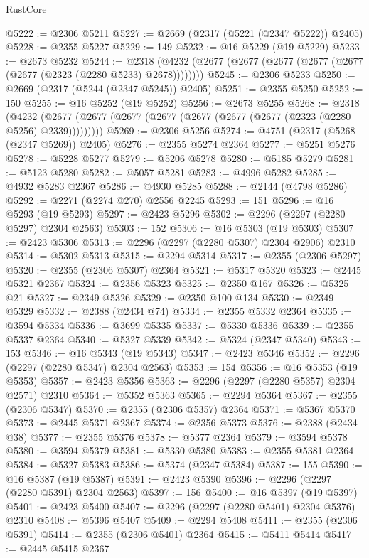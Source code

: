 \begin{lexlean}{RustCore}
\begin{coremodule}
@5222 := @2306 @5211
@5227 := @2669 (@2317 (@5221 (@2347 @5222)) @2405)
@5228 := @2355 @5227
@5229 := 149
@5232 := @16 @5229 (@19 @5229)
@5233 := @2673 @5232
@5244 := @2318 (@4232 (@2677 (@2677 (@2677 (@2677 (@2677 (@2677 (@2323 (@2280 @5233) @2678))))))))
@5245 := @2306 @5233
@5250 := @2669 (@2317 (@5244 (@2347 @5245)) @2405)
@5251 := @2355 @5250
@5252 := 150
@5255 := @16 @5252 (@19 @5252)
@5256 := @2673 @5255
@5268 := @2318
    (@4232 (@2677 (@2677 (@2677 (@2677 (@2677 (@2677 (@2677 (@2323 (@2280 @5256) @2339)))))))))
@5269 := @2306 @5256
@5274 := @4751 (@2317 (@5268 (@2347 @5269)) @2405)
@5276 := @2355 @5274 @2364
@5277 := @5251 @5276
@5278 := @5228 @5277
@5279 := @5206 @5278
@5280 := @5185 @5279
@5281 := @5123 @5280
@5282 := @5057 @5281
@5283 := @4996 @5282
@5285 := @4932 @5283 @2367
@5286 := @4930 @5285
@5288 := @2144 (@4798 @5286)
@5292 := @2271 (@2274 @270) @2556 @2245
@5293 := 151
@5296 := @16 @5293 (@19 @5293)
@5297 := @2423 @5296
@5302 := @2296 (@2297 (@2280 @5297) @2304 @2563)
@5303 := 152
@5306 := @16 @5303 (@19 @5303)
@5307 := @2423 @5306
@5313 := @2296 (@2297 (@2280 @5307) @2304 @2906) @2310
@5314 := @5302 @5313
@5315 := @2294 @5314
@5317 := @2355 (@2306 @5297)
@5320 := @2355 (@2306 @5307) @2364
@5321 := @5317 @5320
@5323 := @2445 @5321 @2367
@5324 := @2356 @5323
@5325 := @2350 @167
@5326 := @5325 @21
@5327 := @2349 @5326
@5329 := @2350 @100 @134
@5330 := @2349 @5329
@5332 := @2388 (@2434 @74)
@5334 := @2355 @5332 @2364
@5335 := @3594 @5334
@5336 := @3699 @5335
@5337 := @5330 @5336
@5339 := @2355 @5337 @2364
@5340 := @5327 @5339
@5342 := @5324 (@2347 @5340)
@5343 := 153
@5346 := @16 @5343 (@19 @5343)
@5347 := @2423 @5346
@5352 := @2296 (@2297 (@2280 @5347) @2304 @2563)
@5353 := 154
@5356 := @16 @5353 (@19 @5353)
@5357 := @2423 @5356
@5363 := @2296 (@2297 (@2280 @5357) @2304 @2571) @2310
@5364 := @5352 @5363
@5365 := @2294 @5364
@5367 := @2355 (@2306 @5347)
@5370 := @2355 (@2306 @5357) @2364
@5371 := @5367 @5370
@5373 := @2445 @5371 @2367
@5374 := @2356 @5373
@5376 := @2388 (@2434 @38)
@5377 := @2355 @5376
@5378 := @5377 @2364
@5379 := @3594 @5378
@5380 := @3594 @5379
@5381 := @5330 @5380
@5383 := @2355 @5381 @2364
@5384 := @5327 @5383
@5386 := @5374 (@2347 @5384)
@5387 := 155
@5390 := @16 @5387 (@19 @5387)
@5391 := @2423 @5390
@5396 := @2296 (@2297 (@2280 @5391) @2304 @2563)
@5397 := 156
@5400 := @16 @5397 (@19 @5397)
@5401 := @2423 @5400
@5407 := @2296 (@2297 (@2280 @5401) @2304 @5376) @2310
@5408 := @5396 @5407
@5409 := @2294 @5408
@5411 := @2355 (@2306 @5391)
@5414 := @2355 (@2306 @5401) @2364
@5415 := @5411 @5414
@5417 := @2445 @5415 @2367

\end{coremodule}
\end{lexlean}
